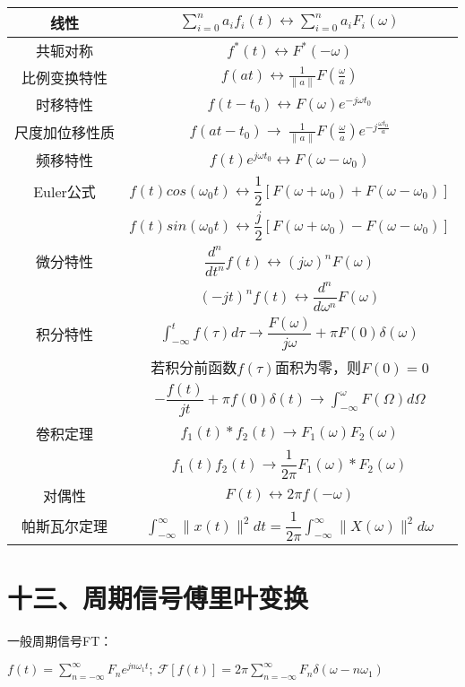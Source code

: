 \begin{tabular}{c|c}
线性 & $\sum_{i=0}^na_if_i(t)\leftrightarrow \sum_{i=0}^na_iF_i(\omega)$ \\
\hline
共轭对称 & $f^*(t) \leftrightarrow F^*(-\omega)$ \\
\hline
比例变换特性 & $f(at) \leftrightarrow \frac 1{\|a\|}F(\frac \omega a)$ \\
\hline
时移特性 & $f(t-t_0) \leftrightarrow F(\omega)e^{-j\omega t_0}$ \\
\hline
尺度加位移性质 & $f(at-t_0) \rightarrow\ \frac 1{\|a\|}F(\frac \omega a)e^{-j\frac {\omega t_0}a}$ \\
\hline
频移特性 & $f(t)e^{j\omega t_0} \leftrightarrow F(\omega-\omega_0)$ \\
\hline
Euler公式 & $f(t)cos(\omega_0t) \leftrightarrow \dfrac 12[F(\omega+\omega_0)+F(\omega-\omega_0)]$ \\
 & $f(t)sin(\omega_0t) \leftrightarrow \dfrac j2[F(\omega+\omega_0)-F(\omega-\omega_0)]$ \\
\hline
微分特性 & $\dfrac {d^n}{dt^n}f(t) \leftrightarrow (j\omega)^nF(\omega)$ \\
 & $(-jt)^nf(t) \leftrightarrow \dfrac {d^n}{d\omega^n}F(\omega)$ \\
\hline
积分特性 & $\int_{-\infty}^tf(\tau)d\tau \rightarrow \dfrac {F(\omega)}{j\omega}+\pi F(0)\delta(\omega)$ \\
 & 若积分前函数$f(\tau)$面积为零，则$F(0) = 0$ \\
 & $-\dfrac {f(t)}{jt}+\pi f(0)\delta(t) \rightarrow \int_{-\infty}^{\omega}F(\Omega)d\Omega$ \\
\hline
卷积定理 & $f_1(t)*f_2(t) \rightarrow F_1(\omega)F_2(\omega)$ \\
 & $f_1(t)f_2(t) \rightarrow \dfrac 1{2\pi}F_1(\omega)*F_2(\omega)$ \\
\hline
对偶性 & $F(t) \leftrightarrow 2\pi f(-\omega)$ \\
\hline
帕斯瓦尔定理 & $\int ^{\infty} _{-\infty} \|x(t)\|^2 dt = \dfrac{1}{2\pi}\int ^{\infty} _{-\infty} \|X(\omega)\|^2 d\omega$ \\
\end{tabular}

\section*{十三、周期信号傅里叶变换}

一般周期信号FT：

$f(t)=\sum_{n=-\infty}^{\infty}F_ne^{jn\omega_1 t};\ \mathcal{F}[f(t)]=2\pi\sum_{n=-\infty}^{\infty}F_n\delta(\omega-n\omega_1)$

